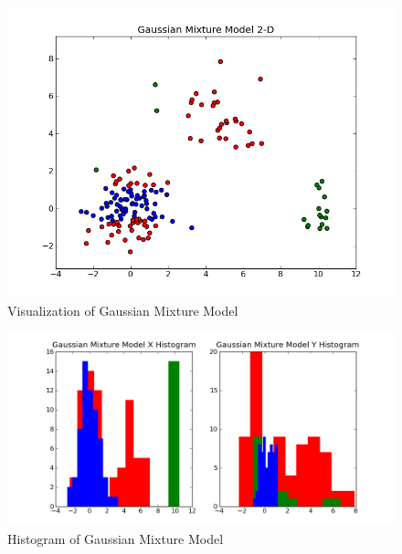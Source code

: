 \begin{itemize}
\begin{figure}[htb]
\centering
\includegraphics[width=18cm]{GMM.png}
\caption{Visualization of Gaussian Mixture Model}
\label{gmm}
\end{figure}

\begin{figure}[htb]
\centering
\includegraphics[width=18cm]{GMMhist.png}
\caption{Histogram of Gaussian Mixture Model}
\label{gmmhist}
\end{figure}

\end{itemize}


